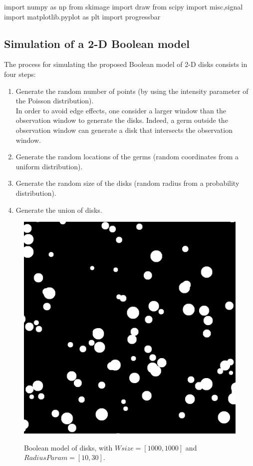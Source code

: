 \def\QRCODE{TB_IPR_TUT.IMG.boolean_models_pythonqrcode.png}
\def\QRPAGE{http://www.iptutorials.science/tree/master/TB_IPR/TUT.IMG.boolean_models/python}

\begin{python}
import numpy as np
from skimage import draw
from scipy import misc,signal
import matplotlib.pyplot as plt
import progressbar
\end{python}

\subsection{Simulation of a 2-D Boolean model}
The process for simulating the proposed Boolean model of 2-D disks consists in four steps:
\begin{enumerate}
\item Generate the random number of points (by using the intensity parameter of the Poisson distribution). \\
In order to avoid edge effects, one consider a larger window than the observation window to generate the disks.
Indeed, a germ outside the observation window can generate a disk that intersects the observation window. 
\item Generate the random locations of the germs (random coordinates from a uniform distribution).
\item Generate the random size of the disks (random radius from a probability distribution).
\item Generate the union of disks.
\end{enumerate}
\vspace*{-8pt}
\begin{figure}[htbp]
\centering\caption{Boolean model of disks, with $Wsize=[1000,1000]$ and $RadiusParam=[10,30]$.}%
\includegraphics[width=.4\linewidth]{boolean_model.python.png}%
\label{fig:boolean_models:python:bmdisks}%
\end{figure}
\vspace*{-8pt}

